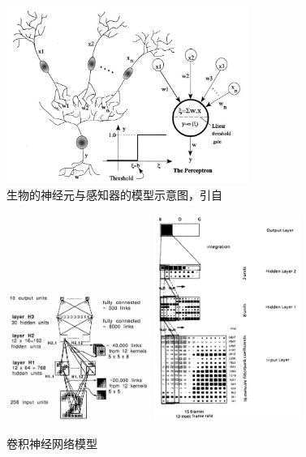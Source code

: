 \begin{figure}[H]
  \centering
  \includegraphics[width=0.7\textwidth]{img/perceptron.png}
  \caption{生物的神经元与感知器的模型示意图，引自\cite{basheer2000artificial}}
  \label{fig:perceptron}
\end{figure}

\begin{figure}[h]
  \centering%
    {\includegraphics[width=0.42\textwidth]{img/lecun1989backpropagation.png}}%
  \hspace{4em}%
      {\includegraphics[width=0.42\textwidth]{img/waibel1995phoneme.png}}
  \caption{卷积神经网络模型}
  \label{fig:cnn}
\end{figure}

